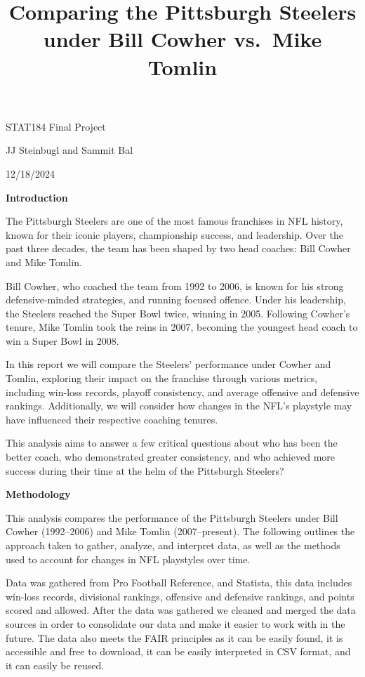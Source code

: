 \documentclass[
  letterpaper,
  DIV=11,
  numbers=noendperiod]{scrartcl}
\title{Comparing the Pittsburgh Steelers under Bill Cowher vs.~Mike
Tomlin}
\author{}
\date{}
\begin{document}
\maketitle


\begin{center}

STAT184 Final Project

JJ Steinbugl and Sammit Bal

12/18/2024

\end{center}

\textbf{Introduction}

The Pittsburgh Steelers are one of the most famous franchises in NFL
history, known for their iconic players, championship success, and
leadership. Over the past three decades, the team has been shaped by two
head coaches: Bill Cowher and Mike Tomlin.

Bill Cowher, who coached the team from 1992 to 2006, is known for his
strong defensive-minded strategies, and running focused offence. Under
his leadership, the Steelers reached the Super Bowl twice, winning in
2005. Following Cowher's tenure, Mike Tomlin took the reins in 2007,
becoming the youngest head coach to win a Super Bowl in 2008.

In this report we will compare the Steelers' performance under Cowher
and Tomlin, exploring their impact on the franchise through various
metrics, including win-loss records, playoff consistency, and average
offensive and defensive rankings. Additionally, we will consider how
changes in the NFL's playstyle may have influenced their respective
coaching tenures.

This analysis aims to answer a few critical questions about who has been
the better coach, who demonstrated greater consistency, and who achieved
more success during their time at the helm of the Pittsburgh Steelers?

\textbf{Methodology}

This analysis compares the performance of the Pittsburgh Steelers under
Bill Cowher (1992--2006) and Mike Tomlin (2007--present). The following
outlines the approach taken to gather, analyze, and interpret data, as
well as the methods used to account for changes in NFL playstyles over
time.

Data was gathered from Pro Football Reference, and Statista, this data
includes win-loss records, divisional rankings, offensive and defensive
rankings, and points scored and allowed. After the data was gathered we
cleaned and merged the data sources in order to consolidate our data and
make it easier to work with in the future. The data also meets the FAIR
principles as it can be easily found, it is accessible and free to
download, it can be easily interpreted in CSV format, and it can easily
be reused.
\end{document}
